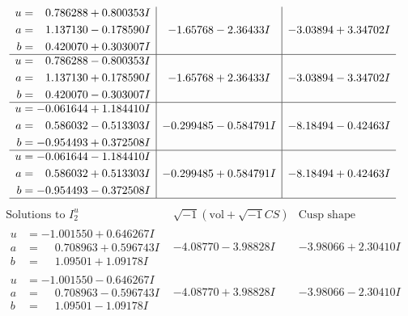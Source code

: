 \documentclass[1p]{elsarticle_modified}
\theoremstyle{definition}
\newcommand{\I}{\sqrt{-1}}
\begin{document}
$$\begin{array}{c|c|c}
\begin{aligned}
u &= \phantom{-}0.786288 + 0.800353 I \\
a &= \phantom{-}1.137130 - 0.178590 I \\
b &= \phantom{-}0.420070 + 0.303007 I\end{aligned}
 & -1.65768 - 2.36433 I & -3.03894 + 3.34702 I \\ \hline\begin{aligned}
u &= \phantom{-}0.786288 - 0.800353 I \\
a &= \phantom{-}1.137130 + 0.178590 I \\
b &= \phantom{-}0.420070 - 0.303007 I\end{aligned}
 & -1.65768 + 2.36433 I & -3.03894 - 3.34702 I \\ \hline\begin{aligned}
u &= -0.061644 + 1.184410 I \\
a &= \phantom{-}0.586032 - 0.513303 I \\
b &= -0.954493 + 0.372508 I\end{aligned}
 & -0.299485 - 0.584791 I & -8.18494 - 0.42463 I \\ \hline\begin{aligned}
u &= -0.061644 - 1.184410 I \\
a &= \phantom{-}0.586032 + 0.513303 I \\
b &= -0.954493 - 0.372508 I\end{aligned}
 & -0.299485 + 0.584791 I & -8.18494 + 0.42463 I\\
 \hline 
 \end{array}$$\newpage$$\begin{array}{c|c|c}  
\text{Solutions to }I^u_{2}& \I (\text{vol} + \sqrt{-1}CS) & \text{Cusp shape}\\
 \hline 
\begin{aligned}
u &= -1.001550 + 0.646267 I \\
a &= \phantom{-}0.708963 + 0.596743 I \\
b &= \phantom{-}1.09501 + 1.09178 I\end{aligned}
 & -4.08770 - 3.98828 I & -3.98066 + 2.30410 I \\ \hline\begin{aligned}
u &= -1.001550 - 0.646267 I \\
a &= \phantom{-}0.708963 - 0.596743 I \\
b &= \phantom{-}1.09501 - 1.09178 I\end{aligned}
 & -4.08770 + 3.98828 I & -3.98066 - 2.30410 I \\ \hline\begin{aligned}

\end{aligned}
\end{array}$$
\end{document}
